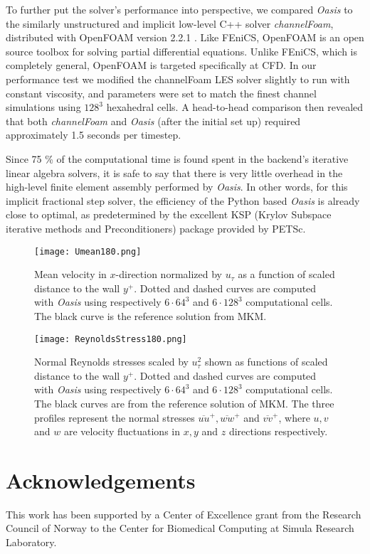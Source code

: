 \documentclass[final,3p,times,twocolumn]{elsarticle}
\newcounter{bla}
\begin{document}
To further put the solver's performance into perspective, we compared \emph{Oasis} to the similarly unstructured and implicit low-level C++ solver \emph{channelFoam}, distributed with OpenFOAM version 2.2.1 \cite{channelfoam}. Like FEniCS, OpenFOAM is an open source toolbox for solving partial differential equations. Unlike FEniCS, which is completely general, OpenFOAM is targeted specifically at CFD. In our performance test we modified the channelFoam LES solver slightly to run with constant viscosity, and parameters were set to match the finest channel simulations using $128^3$ hexahedral cells. A head-to-head comparison then revealed that both \emph{channelFoam} and \emph{Oasis} (after the initial set up) required approximately 1.5 seconds per timestep.

Since 75 \% of the computational time is found spent in the backend's iterative linear algebra solvers, it is safe to say that there is very little overhead in the high-level finite element assembly performed by \emph{Oasis}. In other words, for this implicit fractional step solver, the efficiency of the Python based \emph{Oasis} is already close to optimal, as predetermined by the excellent KSP (Krylov Subspace iterative methods and Preconditioners) package provided by PETSc.

\begin{figure}
\texttt{[image: Umean180.png]}
\caption{Mean velocity in $x$-direction normalized by $u_{\tau}$ as a function of scaled distance to the wall $y^+$. Dotted and dashed curves are computed with \emph{Oasis} using respectively $6\cdot 64^3$ and $6\cdot 128^3$ computational cells. The black curve is the reference solution from MKM.}
\label{fig:Umean}
\end{figure}
\begin{figure}
\texttt{[image: ReynoldsStress180.png]}
\caption{Normal Reynolds stresses scaled by $u_{\tau}^2$ shown as functions of scaled distance to the wall $y^+$. Dotted and dashed curves are computed with \emph{Oasis} using respectively $6\cdot 64^3$ and $6\cdot 128^3$ computational cells. The black curves are from the reference solution of MKM. The three profiles represent the normal stresses $\overline{uu}^+, \overline{ww}^+$ and $\overline{vv}^+$, where $u, v$ and $w$ are velocity fluctuations in $x, y$ and $z$ directions respectively.}
\label{fig:Reynoldsstress}
\end{figure}

\section*{Acknowledgements}
This work has been supported by a Center of Excellence grant from the Research Council of Norway to the Center for Biomedical Computing at Simula Research Laboratory.
\end{document}
